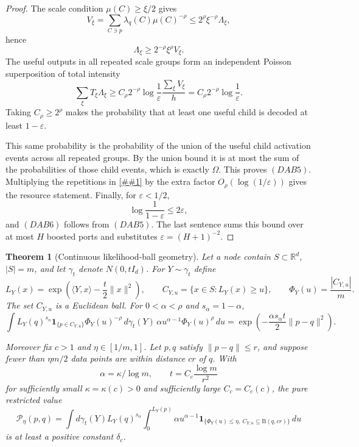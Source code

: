 \documentclass[10pt]{article}
\newcommand{\cref}[1]{\ref{##1}}
\newtheorem{theorem}{Theorem}[section]
\theoremstyle{definition}
\newcommand{\R}{\mathbb{R}}
\newcommand{\Ball}{\mathrm{B}}
\newcommand{\ip}[2]{\langle #1,#2\rangle}
\begin{document}
\begin{proof}
   The scale condition \(\mu(C)\ge\xi/2\) gives
   \[
      V_\xi
      =
      \sum_{C\ni p}\lambda_q(C)\mu(C)^{-\rho}
      \le
      2^\rho\xi^{-\rho}\Lambda_\xi,
   \]
   hence
   \[
      \Lambda_\xi\ge2^{-\rho}\xi^\rho V_\xi .
      \tag{DAB7}
   \]
   The useful outputs in all repeated scale groups form an independent
   Poisson superposition of total intensity
   \[
      \sum_\xi T_\xi\Lambda_\xi
      \ge
      C_\rho2^{-\rho}\log\frac1\varepsilon
      \frac{\sum_\xi V_\xi}{h}
      =
      C_\rho2^{-\rho}\log\frac1\varepsilon .
   \]
   Taking \(C_\rho\ge2^\rho\) makes the probability that at least one useful
   child is decoded at least \(1-\varepsilon\).

   This same probability is the probability of the union of the useful child
   activation events across all repeated groups.  By the union bound it is at
   most the sum of the probabilities of those child events, which is exactly
   \(\Omega\).  This proves \((DAB5)\).
   Multiplying the repetitions in \cref{lem:dyadic-structured-amplification}
   by the extra factor \(O_\rho(\log(1/\varepsilon))\) gives the resource
   statement.  Finally, for \(\varepsilon<1/2\),
   \[
      \log\frac1{1-\varepsilon}\le2\varepsilon,
   \]
   and \((DAB6)\) follows from \((DAB5)\).  The last sentence sums this bound
   over at most \(H\) boosted ports and substitutes
   \(\varepsilon=(H+1)^{-2}\).
\end{proof}

\begin{theorem}[Continuous likelihood-ball geometry]\label{thm:continuous-likelihood-balls}
   Let a node contain $S\subset\R^d$, $|S|=m$, and let $\gamma_t$ denote $N(0,tI_d)$. For $Y\sim\gamma_t$ define
   \[
      L_Y(x)=\exp\!\left(\ip{Y}{x}-\frac t2\|x\|^2\right),
      \qquad
      C_{Y,u}=\{x\in S:L_Y(x)\ge u\},
      \qquad
      \Phi_Y(u)=\frac{|C_{Y,u}|}{m}.
   \]
   The set $C_{Y,u}$ is a Euclidean ball. For $0<\alpha<\rho$ and $s_\alpha=1-\alpha$,
   \[
      \int L_Y(q)^{s_\alpha}\mathbf 1_{\{p\in C_{Y,u}\}}\Phi_Y(u)^{-\rho}
      \,d\gamma_t(Y)\,\alpha u^{\alpha-1}\Phi_Y(u)^\rho\,du
      =
      \exp\!\left(-\frac{\alpha s_\alpha t}{2}\|p-q\|^2\right).
   \]

   Moreover fix $c>1$ and $\eta\in[1/m,1]$. Let $p,q$ satisfy $\|p-q\|\le r$, and suppose fewer than $\eta m/2$ data points are within distance $cr$ of $q$. With
   \[
      \alpha=\kappa/\log m,
      \qquad
      t=C_c\frac{\log m}{r^2}
   \]
   for sufficiently small $\kappa=\kappa(c)>0$ and sufficiently large $C_c=C_c(c)$, the pure restricted value
   \[
      \mathcal P_\eta(p,q)
      =
      \int d\gamma_t(Y)L_Y(q)^{s_\alpha}
      \int_0^{L_Y(p)}
      \alpha u^{\alpha-1}
      \mathbf 1_{\{\Phi_Y(u)\le\eta,\ C_{Y,u}\subseteq \Ball(q,cr)\}}\,du
   \]
   is at least a positive constant $\delta_c$.
\end{theorem}
\end{document}
